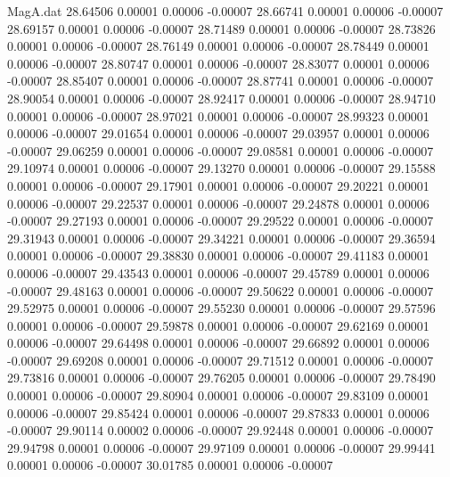 \begin{filecontents}{MagA.dat}
  28.64506    0.00001    0.00006   -0.00007
  28.66741    0.00001    0.00006   -0.00007
  28.69157    0.00001    0.00006   -0.00007
  28.71489    0.00001    0.00006   -0.00007
  28.73826    0.00001    0.00006   -0.00007
  28.76149    0.00001    0.00006   -0.00007
  28.78449    0.00001    0.00006   -0.00007
  28.80747    0.00001    0.00006   -0.00007
  28.83077    0.00001    0.00006   -0.00007
  28.85407    0.00001    0.00006   -0.00007
  28.87741    0.00001    0.00006   -0.00007
  28.90054    0.00001    0.00006   -0.00007
  28.92417    0.00001    0.00006   -0.00007
  28.94710    0.00001    0.00006   -0.00007
  28.97021    0.00001    0.00006   -0.00007
  28.99323    0.00001    0.00006   -0.00007
  29.01654    0.00001    0.00006   -0.00007
  29.03957    0.00001    0.00006   -0.00007
  29.06259    0.00001    0.00006   -0.00007
  29.08581    0.00001    0.00006   -0.00007
  29.10974    0.00001    0.00006   -0.00007
  29.13270    0.00001    0.00006   -0.00007
  29.15588    0.00001    0.00006   -0.00007
  29.17901    0.00001    0.00006   -0.00007
  29.20221    0.00001    0.00006   -0.00007
  29.22537    0.00001    0.00006   -0.00007
  29.24878    0.00001    0.00006   -0.00007
  29.27193    0.00001    0.00006   -0.00007
  29.29522    0.00001    0.00006   -0.00007
  29.31943    0.00001    0.00006   -0.00007
  29.34221    0.00001    0.00006   -0.00007
  29.36594    0.00001    0.00006   -0.00007
  29.38830    0.00001    0.00006   -0.00007
  29.41183    0.00001    0.00006   -0.00007
  29.43543    0.00001    0.00006   -0.00007
  29.45789    0.00001    0.00006   -0.00007
  29.48163    0.00001    0.00006   -0.00007
  29.50622    0.00001    0.00006   -0.00007
  29.52975    0.00001    0.00006   -0.00007
  29.55230    0.00001    0.00006   -0.00007
  29.57596    0.00001    0.00006   -0.00007
  29.59878    0.00001    0.00006   -0.00007
  29.62169    0.00001    0.00006   -0.00007
  29.64498    0.00001    0.00006   -0.00007
  29.66892    0.00001    0.00006   -0.00007
  29.69208    0.00001    0.00006   -0.00007
  29.71512    0.00001    0.00006   -0.00007
  29.73816    0.00001    0.00006   -0.00007
  29.76205    0.00001    0.00006   -0.00007
  29.78490    0.00001    0.00006   -0.00007
  29.80904    0.00001    0.00006   -0.00007
  29.83109    0.00001    0.00006   -0.00007
  29.85424    0.00001    0.00006   -0.00007
  29.87833    0.00001    0.00006   -0.00007
  29.90114    0.00002    0.00006   -0.00007
  29.92448    0.00001    0.00006   -0.00007
  29.94798    0.00001    0.00006   -0.00007
  29.97109    0.00001    0.00006   -0.00007
  29.99441    0.00001    0.00006   -0.00007
  30.01785    0.00001    0.00006   -0.00007

\end{filecontents}

